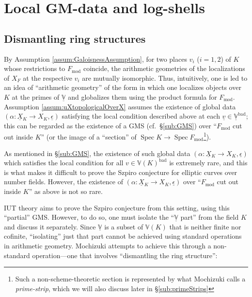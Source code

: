 \documentclass[12pt, reqno, a4paper]{amsart}
\def\udl#1{\underline{#1}} %
\def\bV{\mathbb{V}}
\def\uX{\udl{X}} %
\def\uV{\udl{\bV}} %
\def\uv{\udl{v}} %
\def\ep{\epsilon} %
\def\uep{\udl{\ep}} %
\def\bad{\mathrm{bad}}
\DeclareMathOperator{\Spec}{Spec}
\DeclareMathOperator{\tmod}{mod}
\begin{document}
\section{Local GM-data and log-shells}
\subsection{Dismantling ring structures}\label{sub:dismantlingRingStr}
By Assumption \ref{assum:GaloisnessAssumption}, for two places $v_i$ ($i=1,2$) of $K$ whose restrictions to $F_{\tmod}$ coincide, the arithmetic geometries of the localizations of $X_F$ at the respective $v_i$ are mutually isomorphic.
Thus, intuitively, one is led to an idea of ``arithmetic geometry'' of the form in which one localizes objects over $K$ at the primes of $\uV$ and globalizes them using the product formula for $F_{\tmod}$.
Assumption \ref{assum:uXtopologicalOverX} assumes the existence of global data $(\alpha\colon\uX{}_K\to X_K,\uep)$ satisfying the local condition described above at each $\uv\in\uV^{\bad}$; this can be regarded as the existence of a GMS (cf.\ \S\ref{sub:GMS}) over ``$F_{\tmod}$ cut out inside $K$'' (or the image of a ``section'' of $\Spec K\to\Spec F_{\tmod}$\footnote{Such a non-scheme-theoretic section is represented by what Mochizuki calls a {\it prime-strip}, which we will also discuss later in \S\ref{sub:primeStrips}}).

As mentioned in \S\ref{sub:GMS}, the existence of such global data $(\alpha\colon\uX{}_K\to X_K,\uep)$ which satisfies the local condition for all $v\in \bV(K)^\bad$ is extremely rare, and this is what makes it difficult to prove the Szpiro conjecture for elliptic curves over number fields.
However, the existence of $(\alpha\colon\uX{}_K\to X_K,\uep)$ over ``$F_{\tmod}$ cut out inside $K$'' as above is not so rare.

IUT theory aims to prove the Szpiro conjecture from this setting, using this ``partial'' GMS.
However, to do so, one must isolate the ``$\uV$ part'' from the field $K$ and discuss it separately. 
Since $\uV$ is a subset of $\bV(K)$ that is neither finite nor cofinite, ``isolating'' just that part cannot be achieved using standard operations in arithmetic geometry. 
Mochizuki attempts to achieve this through a non-standard operation---one that involves ``dismantling the ring structure'':
\end{document}
